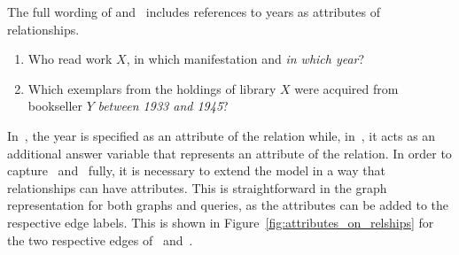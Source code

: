 The full wording of  and~ includes references to years
as attributes of relationships.
%
\begin{enumerate}
  \item[\exaquery{1}]
    Who read %
    work $X$, in which manifestation and \emph{in which year}?
  \item[\exaquery{5}]
    Which exemplars from the holdings of library $X$ were acquired from bookseller $Y$
    \emph{between 1933 and 1945}?
\end{enumerate}
%
In~, the year is specified as an attribute of the  relation
while, in~, it acts as an additional answer variable that represents
an attribute of the  relation.
In order to capture~ and~ fully,
it is necessary to extend the model in a way that relationships can have attributes.
This is straightforward in the graph representation for both graphs and queries, as the attributes can be added to
the respective edge labels. This is shown in Figure~\ref{fig:attributes_on_relships}
for the two respective edges of~ and~.

